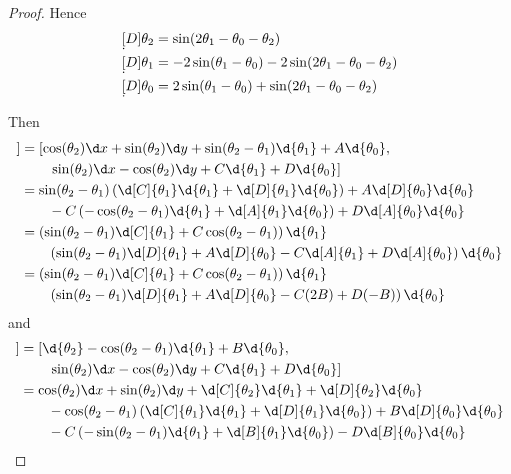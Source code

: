 \documentclass{article}
\begin{document}
\begin{proof}
Hence 
\begin{align*}
\d[D]{\theta_2} & = \sin(2 \theta_1 - \theta_0 - \theta_2)
\\ \d[D]{\theta_1} & = - 2 \sin(\theta_1 - \theta_0) - 2 \sin (2 \theta_1 - \theta_0 - \theta_2)
\\ \d[D]{\theta_0} & = 2 \sin(\theta_1 - \theta_0) + \sin(2 \theta_1 - \theta_0 - \theta_2)
\end{align*}

Then 
\begin{align*}
[X_1, [X_1, X_2]] & = \left[ \cos(\theta_2) \d x  + \sin(\theta_2) \d y  + \sin(\theta_2 - \theta_1)  \d {\theta_1} + A \d {\theta_0}, \right.
\\ & \quad \quad \left.  \sin(\theta_2) \d x  - \cos(\theta_2) \d y + C \d {\theta_1} + D \d {\theta_0} \right]
\\ & = \sin(\theta_2 - \theta_1) \left( \d [C] {\theta_1} \d {\theta_1} + \d [D] {\theta_1} \d {\theta_0} \right)
 + A \d [D] {\theta_0} \d {\theta_0}
\\ & \quad \quad - C \left( -\cos(\theta_2 - \theta_1) \d {\theta_1} + \d [A] {\theta_1} \d {\theta_0} \right) + D \d [A] {\theta_0} \d {\theta_0}
\\ & = \left(  \sin(\theta_2 - \theta_1) \d[C]{\theta_1} + C \cos(\theta_2 - \theta_1) \right)\d {\theta_1}
\\ & \quad \quad \left( \sin(\theta_2 - \theta_1) \d[D]{\theta_1} + A \d[D]{\theta_0} - C \d[A]{\theta_1} + D \d[A]{\theta_0} \right) \d {\theta_0}
\\ & = \left(  \sin(\theta_2 - \theta_1) \d[C]{\theta_1} + C \cos(\theta_2 - \theta_1) \right)\d {\theta_1}
\\ & \quad \quad \left( \sin(\theta_2 - \theta_1) \d[D]{\theta_1} + A \d[D]{\theta_0} - C (2B) + D (-B) \right) \d {\theta_0}
\end{align*}
and
\begin{align*}
[X_2, [X_1, X_2]] & = \left[  \d {\theta_2} - \cos(\theta_2 - \theta_1) \d {\theta_1} + B \d {\theta_0}  ,\right.
\\ & \quad \quad \left.  \sin(\theta_2) \d x  - \cos(\theta_2) \d y + C \d {\theta_1} + D \d {\theta_0} \right]
\\ & = \cos(\theta_2) \d x + \sin(\theta_2) \d y + \d[C]{\theta_2} \d{\theta_1} + \d[D]{\theta_2} \d{\theta_0}
\\ & \quad \quad -\cos(\theta_2 - \theta_1) \left(\d[C]{\theta_1} \d{\theta_1} + \d[D]{\theta_1} \d{\theta_0}\right) + B \d[D]{\theta_0} \d{\theta_0}
\\ & \quad \quad - C \left( -\sin(\theta_2 - \theta_1) \d{\theta_1} + \d[B]{\theta_1} \d{\theta_0} \right) - D \d[B]{\theta_0} \d{\theta_0}

\end{align*}
\end{proof}
\end{document}
